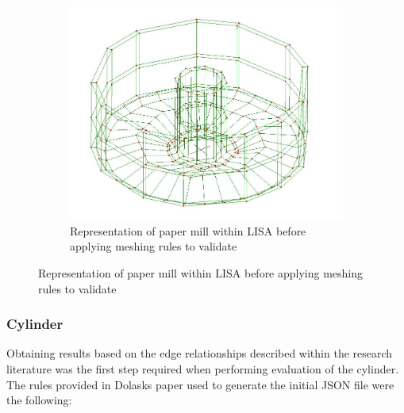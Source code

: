 \begin{figure}
\begin{subfigure}{.5\textwidth}
  \includegraphics[width=0.9\linewidth]{../Graphics/PaperMillWithinLisa.jpeg}
  \caption{Representation of paper mill within LISA before applying meshing rules to validate}
  \label{fig:sub2}
\end{subfigure}
\label{fig:test}
\end{figure}


\subsubsection{Cylinder}
Obtaining results based on the edge relationships described within the research literature was the first step required when performing evaluation of the cylinder. The rules provided in Dolasks paper used to generate the initial JSON file were the following:




